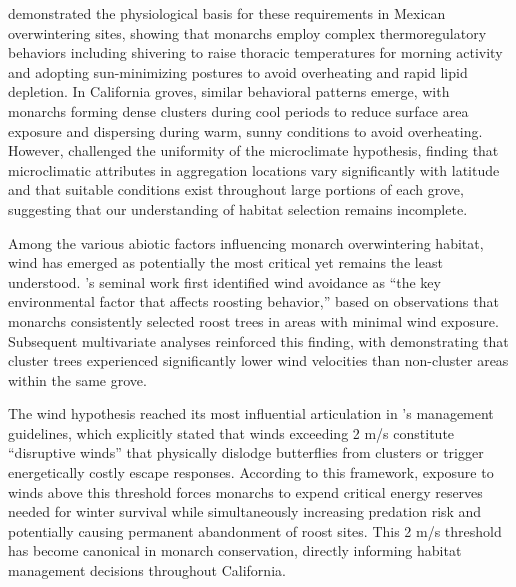 \citet{Masters1988_ACNENTPT} demonstrated the physiological basis for these requirements in Mexican overwintering sites, showing that monarchs employ complex thermoregulatory behaviors including shivering to raise thoracic temperatures for morning activity and adopting sun-minimizing postures to avoid overheating and rapid lipid depletion. In California groves, similar behavioral patterns emerge, with monarchs forming dense clusters during cool periods to reduce surface area exposure and dispersing during warm, sunny conditions to avoid overheating. However, \citet{Saniee2022_3VN7I68M} challenged the uniformity of the microclimate hypothesis, finding that microclimatic attributes in aggregation locations vary significantly with latitude and that suitable conditions exist throughout large portions of each grove, suggesting that our understanding of habitat selection remains incomplete.


Among the various abiotic factors influencing monarch overwintering habitat, wind has emerged as potentially the most critical yet remains the least understood. \citet{leongMicroenvironmentalFactorsAssociated1990a}'s seminal work first identified wind avoidance as ``the key environmental factor that affects roosting behavior,'' based on observations that monarchs consistently selected roost trees in areas with minimal wind exposure. Subsequent multivariate analyses reinforced this finding, with \citet{leongUseMultivariateAnalyses1991} demonstrating that cluster trees experienced significantly lower wind velocities than non-cluster areas within the same grove.

The wind hypothesis reached its most influential articulation in \citet{leongEvaluationManagementCalifornia2016}'s management guidelines, which explicitly stated that winds exceeding 2 m/s constitute ``disruptive winds'' that physically dislodge butterflies from clusters or trigger energetically costly escape responses. According to this framework, exposure to winds above this threshold forces monarchs to expend critical energy reserves needed for winter survival while simultaneously increasing predation risk and potentially causing permanent abandonment of roost sites. This 2 m/s threshold has become canonical in monarch conservation, directly informing habitat management decisions throughout California.

